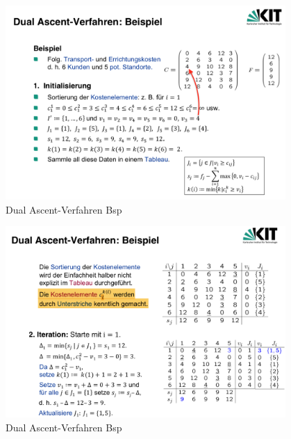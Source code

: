         \begin{exmp}
          
        \end{exmp}
      
        \begin{figure}[H]
          \centering
          \includegraphics[width=0.95\textwidth]{Images/Dual_Ascent_Verfahrten_Bsp(1).png}
          \caption{Dual Ascent-Verfahren Bsp}
          \label{fig:dual_ascent_verfahren_bsp}
        \end{figure}

        \begin{figure}[H]
          \centering
          \includegraphics[width=0.95\textwidth]{Images/Dual_Ascent_Verfahrten_Bsp(2).png}
          \caption{Dual Ascent-Verfahren Bsp}
          \label{fig:dual_ascent_verfahren_bsp}
        \end{figure}

